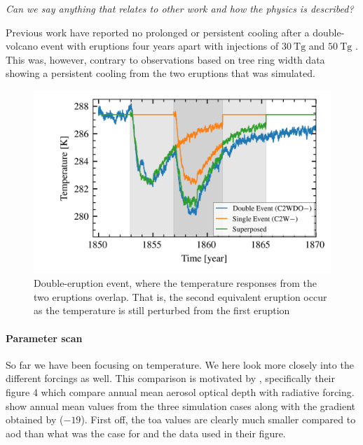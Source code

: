 \documentclass[twocol]{ametsocV5}
\begin{document}
\emph{Can we say anything that relates to other work and how the physics is described?}

Previous work have reported no prolonged or persistent cooling after a double-volcano
event with eruptions four years apart with  injections of \( \SI{30}{\tera\gram}
\) and \( \SI{50}{\tera\gram} \) \citep{toohey2016b}. This was, however, contrary to
observations based on tree ring width data showing a persistent cooling from the two
eruptions that was simulated.

\begin{figure}
  \begin{center}
    \includegraphics[width=0.95\linewidth]{figures/double-overlap-superpose.png}
  \end{center}
  \caption{Double-eruption event, where the temperature responses from the two eruptions
    overlap. That is, the second equivalent eruption occur as the temperature is still
    perturbed from the first eruption}%
  \label{fig:double-overlap-superpose}
\end{figure}

\paragraph{Parameter scan}

So far we have been focusing on temperature. We here look more closely into the
different forcings as well. This comparison is motivated by \citet{gregory2016},
specifically their figure 4 which compare annual mean aerosol optical depth with
radiative forcing.  show annual mean values from the three
simulation cases along with the gradient obtained by \citet{gregory2016} (\(-19\)).
First off, the \acrshort{toa} values are clearly much smaller compared to \acrshort{aod}
than what was the case for \citet{gregory2016} and the data used in their figure.
\end{document}
